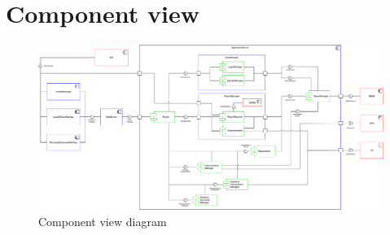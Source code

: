 		\section{Component view}
			\begin{figure}[!h]
				\centering
				\includegraphics[width=\textwidth]{images/DD2/ComponentDiagram.pdf}
				\caption{Component view diagram}
			\end{figure}
